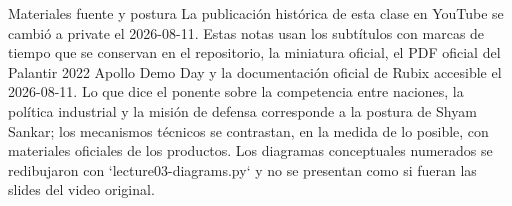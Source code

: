 \makecscover

\begin{warningbox}{Materiales fuente y postura}
La publicación histórica de esta clase en YouTube se cambió a private el 2026-08-11. Estas notas usan los subtítulos con marcas de tiempo que se conservan en el repositorio, la miniatura oficial, el PDF oficial del Palantir 2022 Apollo Demo Day y la documentación oficial de Rubix accesible el 2026-08-11. Lo que dice el ponente sobre la competencia entre naciones, la política industrial y la misión de defensa corresponde a la postura de Shyam Sankar; los mecanismos técnicos se contrastan, en la medida de lo posible, con materiales oficiales de los productos. Los diagramas conceptuales numerados se redibujaron con `lecture03-diagrams.py` y no se presentan como si fueran las slides del video original.
\end{warningbox}

